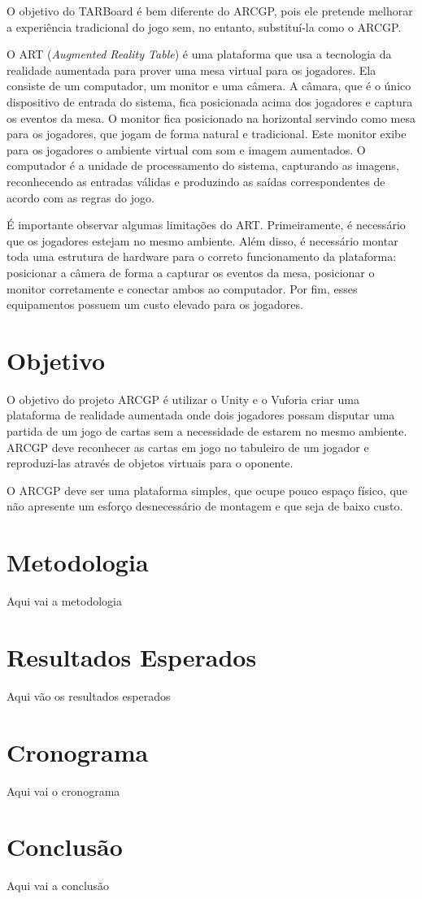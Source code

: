 \documentclass[conference]{IEEEtran}
\begin{document}
O objetivo do TARBoard é bem diferente do ARCGP, pois ele pretende melhorar a 
experiência tradicional do jogo sem, no entanto, substituí-la como o ARCGP.

O ART (\textit{Augmented Reality Table}) \cite{Lam:2006:AAR:1128923.1128987} é 
uma plataforma que usa a tecnologia da realidade aumentada para prover uma mesa 
virtual para os jogadores. Ela consiste de um computador, um monitor e uma 
câmera. A câmara, que é o único dispositivo de entrada do sistema, fica 
posicionada acima dos jogadores e captura os eventos da mesa. O monitor fica 
posicionado na horizontal servindo como mesa para os jogadores, que jogam de 
forma natural e tradicional. Este monitor exibe para os jogadores o ambiente 
virtual com som e imagem aumentados. O computador é a unidade de processamento 
do sistema, capturando as imagens, reconhecendo as entradas válidas e produzindo 
as saídas correspondentes de acordo com as regras do jogo.

É importante observar algumas limitações do ART. Primeiramente, é necessário 
que os jogadores estejam no mesmo ambiente. Além disso, é necessário montar 
toda uma estrutura de hardware para o correto funcionamento da plataforma: 
posicionar a câmera de forma a capturar os eventos da mesa, posicionar o monitor 
corretamente e conectar ambos ao computador. Por fim, esses equipamentos 
possuem um custo elevado para os jogadores.

\section{Objetivo}
\label{objetivo}
O objetivo do projeto ARCGP é utilizar o Unity e o Vuforia criar uma plataforma 
de realidade aumentada onde dois jogadores possam disputar uma partida de um 
jogo de cartas sem a necessidade de estarem no mesmo ambiente. ARCGP deve 
reconhecer as cartas em jogo no tabuleiro de um jogador e reproduzi-las através 
de objetos virtuais para o oponente.

O ARCGP deve ser uma plataforma simples, que ocupe pouco espaço físico, que não 
apresente um esforço desnecessário de montagem e que seja de baixo custo.

\section{Metodologia}
\label{metodologia}
Aqui vai a metodologia

\section{Resultados Esperados}
\label{resultados_esperados}
Aqui vão os resultados esperados

\section{Cronograma}
\label{cronograma}
Aqui vai o cronograma

\section{Conclusão}
\label{conclusao}
Aqui vai a conclusão



\end{document}
